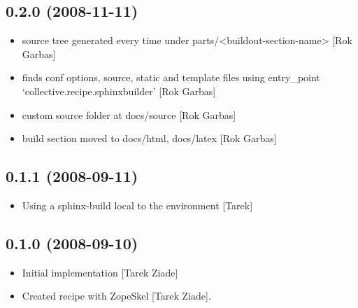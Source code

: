 \documentclass[letterpaper,10pt,english]{sphinxmanual}
\begin{document}
\subsection{0.2.0 (2008-11-11)}
\label{history:id15}\begin{itemize}
\item {} 
source tree generated every time under
parts/\textless{}buildout-section-name\textgreater{} {[}Rok Garbas{]}

\item {} 
finds conf options, source, static and template files using
entry\_point `collective.recipe.sphinxbuilder' {[}Rok Garbas{]}

\item {} 
custom source folder at docs/source {[}Rok Garbas{]}

\item {} 
build section moved to docs/html, docs/latex {[}Rok Garbas{]}

\end{itemize}


\subsection{0.1.1 (2008-09-11)}
\label{history:id16}\begin{itemize}
\item {} 
Using a sphinx-build local to the environment {[}Tarek{]}

\end{itemize}


\subsection{0.1.0 (2008-09-10)}
\label{history:id17}\begin{itemize}
\item {} 
Initial implementation {[}Tarek Ziade{]}

\item {} 
Created recipe with ZopeSkel {[}Tarek Ziade{]}.

\end{itemize}
\end{document}
